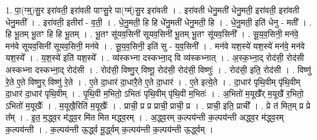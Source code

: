 \documentclass[17pt]{extarticle}
\begin{document}
1. पा॒(ग्म्॒)सु॒र इरा॑वती॒ इरा॑वती पाꣳसु॒रे पा(ग्म्॑)सु॒र इरा॑वती । . इरा॑वती धेनु॒मती॑ धेनु॒मती॒ इरा॑वती॒ इरा॑वती धेनु॒मती᳚ । . इरा॑वती॒ इतीरा᳚ - व॒ती॒ । . धे॒नु॒मती॒ हि हि धे॑नु॒मती॑ धेनु॒मती॒ हि । . धे॒नु॒मती॒ इति॑ धेनु - मती᳚ । . हि भू॒तम् भू॒तꣳ हि हि भू॒तम् । . भू॒तꣳ सू॑यव॒सिनी॑ सूयव॒सिनी॑ भू॒तम् भू॒तꣳ सू॑यव॒सिनी᳚ । . सू॒य॒व॒सिनी॒ मन॑वे॒ मन॑वे सूयव॒सिनी॑ सूयव॒सिनी॒ मन॑वे । . सू॒य॒व॒सिनी॒ इति॑ सु - य॒व॒सिनी᳚ । . मन॑वे यश॒स्ये॑ यश॒स्ये॑ मन॑वे॒ मन॑वे यश॒स्ये᳚ । . य॒श॒स्ये॑ इति॑ यश॒स्ये᳚ । . व्य॑स्कभ्ना दस्कभ्ना॒द् वि व्य॑स्कभ्नात् । . अ॒स्क॒भ्ना॒द् रोद॑सी॒ रोद॑सी अस्कभ्ना दस्कभ्ना॒द् रोद॑सी । . रोद॑सी॒ विष्णु॒र् विष्णू॒ रोद॑सी॒ रोद॑सी॒ विष्णुः॑ । . रोद॑सी॒ इति॒ रोद॑सी । . विष्णु॑ रे॒ते ए॒ते विष्णु॒र् विष्णु॑ रे॒ते । . ए॒ते दा॒धार॑ दा॒धारै॒ते ए॒ते दा॒धार॑ । . ए॒ते इत्ये॒ते । . दा॒धार॑ पृथि॒वीम् पृ॑थि॒वीम् दा॒धार॑ दा॒धार॑ पृथि॒वीम् । . पृ॒थि॒वी म॒भितो॒ ऽभितः॑ पृथि॒वीम् पृ॑थि॒वी म॒भितः॑ । . अ॒भितो॑ म॒यूखै᳚र् म॒यूखै॑ र॒भितो॒ ऽभितो॑ म॒यूखैः᳚ । . म॒यूखै॒रिति॑ म॒यूखैः᳚ । . प्राची॒ प्र प्र प्राची॒ प्राची॒ प्र । . प्राची॒ इति॒ प्राची᳚ । . प्रे त॑ मित॒म् प्र प्रे त᳚म् । . इ॒त॒ म॒द्ध्व॒र म॑द्ध्व॒र मि॑त मित मद्ध्व॒रम् । . अ॒द्ध्व॒रम् क॒ल्पय॑न्ती क॒ल्पय॑न्ती अद्ध्व॒र म॑द्ध्व॒रम् क॒ल्पय॑न्ती । . क॒ल्पय॑न्ती ऊ॒र्द्ध्व मू॒र्द्ध्वम् क॒ल्पय॑न्ती क॒ल्पय॑न्ती ऊ॒र्द्ध्वम् । \newline
\end{document}
